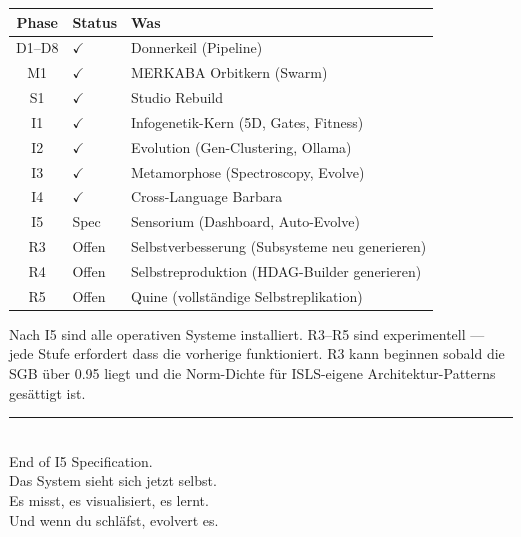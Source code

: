 \documentclass[11pt,a4paper]{article}
\begin{document}
\begin{longtable}{clp{8cm}}
\toprule
\textbf{Phase} & \textbf{Status} & \textbf{Was} \\
\midrule
D1--D8 & $\checkmark$ & Donnerkeil (Pipeline) \\
M1     & $\checkmark$ & MERKABA Orbitkern (Swarm) \\
S1     & $\checkmark$ & Studio Rebuild \\
I1     & $\checkmark$ & Infogenetik-Kern (5D, Gates, Fitness) \\
I2     & $\checkmark$ & Evolution (Gen-Clustering, Ollama) \\
I3     & $\checkmark$ & Metamorphose (Spectroscopy, Evolve) \\
I4     & $\checkmark$ & Cross-Language Barbara \\
I5     & Spec & Sensorium (Dashboard, Auto-Evolve) \\
\midrule
R3     & Offen & Selbstverbesserung (Subsysteme neu generieren) \\
R4     & Offen & Selbstreproduktion (HDAG-Builder generieren) \\
R5     & Offen & Quine (vollst\"andige Selbstreplikation) \\
\bottomrule
\end{longtable}

Nach I5 sind alle operativen Systeme installiert. R3--R5 sind 
experimentell --- jede Stufe erfordert dass die vorherige 
funktioniert. R3 kann beginnen sobald die SGB \"uber 0.95 
liegt und die Norm-Dichte f\"ur ISLS-eigene Architektur-Patterns 
ges\"attigt ist.

\vfill
\begin{center}
\color{isls-gray}\rule{0.5\textwidth}{0.4pt}\\[0.5em]
{\small End of I5 Specification.\\[0.3em]
Das System sieht sich jetzt selbst.\\
Es misst, es visualisiert, es lernt.\\
Und wenn du schl\"afst, evolvert es.}
\end{center}
\end{document}
